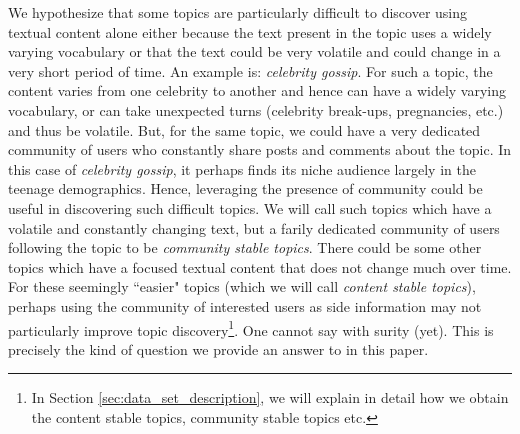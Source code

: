 
We hypothesize that some topics are particularly difficult to discover using textual
content alone either because the text present in the topic uses a widely varying vocabulary or that the text could 
be very volatile and could change in a very short period of time.  An example is: \emph{celebrity gossip}.  
For such a topic, the content varies
from one celebrity to another and hence can have a widely varying vocabulary, or can take unexpected turns 
(celebrity break-ups, pregnancies, etc.) and thus be volatile.  
But, for the same topic, we could
have a very dedicated community of users who constantly share posts and comments about the topic.
In this case of \emph{celebrity gossip}, it perhaps finds its niche audience largely in the teenage demographics.
Hence, leveraging the presence of community could be useful in discovering such
difficult topics.  We will call such topics which have a volatile and constantly
changing text, but a farily dedicated community of users following the topic to
be \emph{community stable topics}.  There could be some other topics which have a focused textual
content that does not change much over time.  
For these seemingly ``easier" topics (which we will call \emph{content stable topics}), perhaps using the community of interested users
as side information may not 
particularly improve topic discovery\footnote{In Section \ref{sec:data_set_description}, we will
explain in detail how we obtain the content stable topics, community stable topics
etc.}.  One cannot say with surity (yet).  This is precisely the kind
of question we provide an answer to in this paper.

